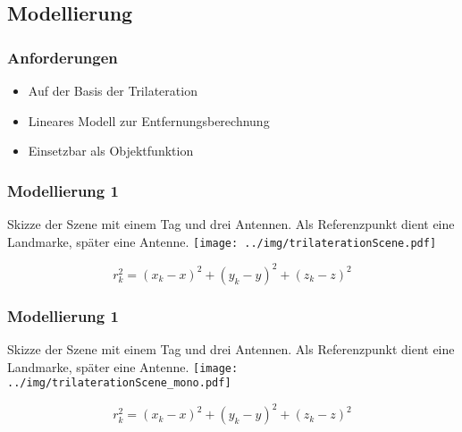 \subsection{Modellierung}
\begin{frame}
  \frametitle{Anforderungen}
%
\begin{itemize} 
  \pause 
  \item Auf der Basis der Trilateration
  \item Lineares Modell zur Entfernungsberechnung
  \item Einsetzbar als Objektfunktion
\end{itemize} 
	
%
\end{frame}
\begin{frame}
  \frametitle{Modellierung  1}
%
  \begin{center}
	\tiny Skizze der Szene mit einem Tag und drei Antennen. Als Referenzpunkt dient eine Landmarke, später eine Antenne.
%
  	\texttt{[image: ../img/trilaterationScene.pdf]}
  \end{center}
\[
r_k^2= (x_k-x)^2 + (y_k-y)^2 + (z_k-z)^2
\]
\end{frame}
\begin{frame}
  \frametitle{Modellierung  1}
%
  \begin{center}
	\tiny Skizze der Szene mit einem Tag und drei Antennen. Als Referenzpunkt dient eine Landmarke, später eine Antenne.
%
  	\texttt{[image: ../img/trilaterationScene\_mono.pdf]}
  \end{center}
\[
r_k^2= (x_k-x)^2 + (y_k-y)^2 + (z_k-z)^2
\]
\end{frame}
